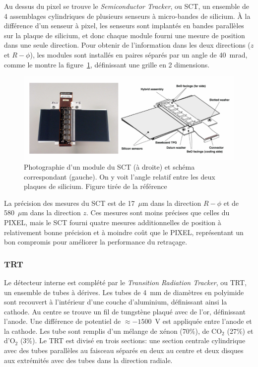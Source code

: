 Au dessus du pixel se trouve le \emph{Semiconductor Tracker},
ou SCT, un ensemble de 4 assemblages cylindriques de plusieurs
senseurs à micro-bandes de silicium. À la différence d'un senseur à
pixel, les senseurs sont implantés en bandes parallèles sur la plaque
de silicium, et donc chaque module fourni une mesure de position dans
une seule direction. Pour obtenir de l'information dans les deux
directions ($z$ et $R-\phi$), les modules sont installés en paires
séparés par un angle de 40~mrad, comme le montre la
figure~\ref{fig:sct}, définissant une grille en 2 dimensions.

\begin{figure}[h]
  \centering
  \includegraphics{sct.pdf}
  \caption{Photographie d'un module du SCT (à droite) et schéma
    correspondant (gauche). On y voit l'angle relatif entre les deux
    plaques de silicium. Figure tirée de la
    référence~\cite{collaboration_atlas_2008}}
  \label{fig:sct}
\end{figure}

La précision des mesures du SCT est de 17~$\mu$m dans la direction
$R-\phi$ et de 580~$\mu$m dans la direction $z$. Ces mesures sont
moins précises que celles du PIXEL, mais le SCT fourni quatre mesures
additionnelles de position à relativement bonne précision et à moindre
coût que le PIXEL, représentant un bon compromis pour améliorer la
performance du retraçage.



\subsubsection{TRT}

Le détecteur interne est complété par le \emph{Transition Radiation
  Tracker}, ou TRT, un ensemble de tubes à dérives. Les tubes de 4~mm
de diamètres en polyimide sont recouvert à l'intérieur d'une couche
d'aluminium, définissant ainsi la cathode. Au centre se trouve un fil
de tungstène plaqué avec de l'or, définissant l'anode. Une différence
de potentiel de $\approx -1500$~V est appliquée entre l'anode et la
cathode. Les tube sont remplis d'un mélange de xénon (70\%), de CO$_2$
(27\%) et d'O$_2$ (3\%). Le TRT est divisé en trois sections: une
section centrale cylindrique avec des tubes parallèles au faisceau
séparés en deux au centre et deux disques aux extrémités avec des
tubes dans la direction radiale.

